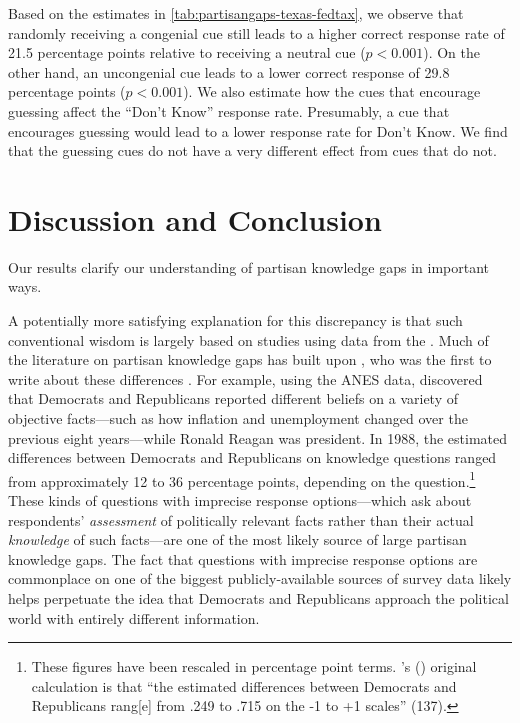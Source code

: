 \documentclass[12pt, letterpaper]{article}
\def\citeapos#1{\citeauthor{#1}'s (\citeyear{#1})}
\begin{document}
Based on the estimates in \cref{tab:partisangaps-texas-fedtax}, we observe that randomly receiving a congenial cue still leads to a higher correct response rate of 21.5 percentage points relative to receiving a neutral cue ($p<0.001$). On the other hand, an uncongenial cue leads to a lower correct response of 29.8 percentage points ($p<0.001$).
We also estimate how the cues that encourage guessing affect the ``Don't Know'' response rate. Presumably, a cue that encourages guessing would lead to a lower response rate for Don't Know. We find that the guessing cues do not have a very different effect from cues that do not. 



\clearpage
\section*{Discussion and Conclusion}

Our results clarify our understanding of partisan knowledge gaps in important ways. 

A potentially more satisfying explanation for this discrepancy is that such conventional wisdom is largely based on studies using data from the \citet{anes_gen}. Much of the literature on partisan knowledge gaps has built upon \citet{bartels_2002}, who was the first to write about these differences \citep{bullocklenz_2019}. For example, using the ANES data, \citet{bartels_2002} discovered that Democrats and Republicans reported different beliefs on a variety of objective facts---such as how inflation and unemployment changed over the previous eight years---while Ronald Reagan was president. In 1988, the estimated differences between Democrats and Republicans on knowledge questions ranged from approximately 12 to 36 percentage points, depending on the question.\footnote{These figures have been rescaled in percentage point terms. \citeapos{bartels_2002}  original calculation is that ``the estimated differences between Democrats and Republicans rang[e] from .249 to .715 on the -1 to +1 scales'' (137).} These kinds of questions with imprecise response options---which ask about respondents' \textit{assessment} of politically relevant facts rather than their actual \textit{knowledge} of such facts---are one of the most likely source of large partisan knowledge gaps. The fact that questions with imprecise response options are commonplace on one of the biggest publicly-available sources of survey data likely helps perpetuate the idea that Democrats and Republicans approach the political world with entirely different information. 
\end{document}
